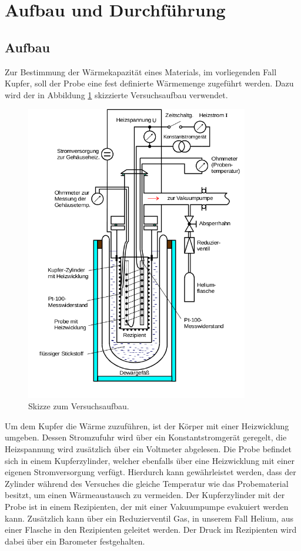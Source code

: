 \section{Aufbau und Durchführung}
\subsection{Aufbau}
\label{sec:Aufbau}

Zur Bestimmung der Wärmekapazität eines Materials, im vorliegenden Fall Kupfer, soll der Probe eine fest definierte Wärmemenge zugeführt werden.
Dazu wird der in Abbildung \ref{fig:aufbau} skizzierte Versuchsaufbau verwendet.

\begin{figure}
  \centering
  \includegraphics[height=13cm]{ressources/aufbau.png}
  \caption{Skizze zum Versuchsaufbau. \cite{skript}}
  \label{fig:aufbau}
\end{figure}

Um dem Kupfer die Wärme zuzuführen, ist der Körper mit einer Heizwicklung umgeben.
Dessen Stromzufuhr wird über ein Konstantstromgerät geregelt, die Heizspannung wird zusätzlich über ein Voltmeter abgelesen.
Die Probe befindet sich in einem Kupferzylinder, welcher ebenfalls über eine Heizwicklung mit einer eigenen Stromversorgung verfügt.
Hierdurch kann gewährleistet werden, dass der Zylinder während des Versuches die gleiche Temperatur wie das Probematerial besitzt, um einen Wärmeaustausch zu vermeiden.
Der Kupferzylinder mit der Probe ist in einem Rezipienten, der mit einer Vakuumpumpe evakuiert werden kann.
Zusätzlich kann über ein Reduzierventil Gas, in unserem Fall Helium, aus einer Flasche in den Rezipienten geleitet werden.
Der Druck im Rezipienten wird dabei über ein Barometer festgehalten.

